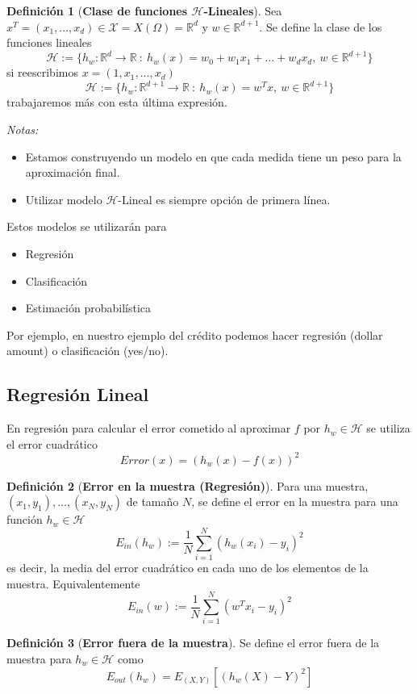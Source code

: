 \documentclass[11pt,a4paper]{article}
\theoremstyle{definition}
\newtheorem{definition}{Definición}[section]
\newcommand{\R}{\mathbb{R}}
\begin{document}
	\begin{definition}[\textbf{Clase de funciones $\mathcal{H}$-Lineales}]
	
		Sea $x^T=(x_1,...,x_d)\in \mathcal{X}=X(\Omega)=\R^d$ y $w\in \R^{d+1}$. Se define la clase de los funciones lineales
		$$\mathcal{H}:=\{h_w \colon \R^{d} \to \R \ : \ h_w(x)=w_0+w_1x_1+\ldots + w_dx_d,\ w \in \R^{d+1}\}$$
		si reescribimos $x=(1,x_1,...,x_d)$
		$$\mathcal{H}:=\{h_w\colon \R^{d+1} \to \R \ : \ h_w(x)=w^Tx, \ w \in \R^{d+1}\}$$
		trabajaremos más con esta última expresión.
	\end{definition}
	
	\textit{Notas:}
	\begin{itemize}
	\item Estamos construyendo un modelo en que cada medida tiene un peso para la aproximación final.
	\item Utilizar modelo $\mathcal{H}$-Lineal es siempre opción de primera línea.
	\end{itemize}
	
	Estos modelos se utilizarán para 
	\begin{itemize}
		\item Regresión
		\item Clasificación
		\item Estimación probabilística
	\end{itemize}
	Por ejemplo, en nuestro ejemplo del crédito podemos hacer regresión (dollar amount) o clasificación (yes/no).
	
	\subsection{Regresión Lineal}
	En regresión para calcular el error cometido al aproximar $f$ por $h_w\in \mathcal{H}$ se utiliza el error cuadrático
	$$Error(x)=(h_w(x)-f(x))^2$$
	
	\begin{definition}[\textbf{Error en la muestra (Regresión)}]
	Para una muestra, $(x_1,y_1),\ldots,(x_N,y_N)$ de tamaño $N$, se define el error en la muestra para una función $h_w\in \mathcal{H}$ 
		$$E_{in} (h_w):=\frac{1}{N}\sum_{i=1}^N(h_w(x_i)-y_i)^2$$
	es decir, la media del error cuadrático en cada uno de los elementos de la muestra. Equivalentemente
	$$E_{in} (w):=\frac{1}{N}\sum_{i=1}^N(w^Tx_i-y_i)^2$$
	\end{definition}
	
	\begin{definition}[\textbf{Error fuera de la muestra}]
	Se define el error fuera de la muestra para $h_w \in \mathcal{H}$ como
	$$E_{out}(h_w)=E_{(X,Y)} \left[(h_w(X)-Y)^2\right]$$
	\end{definition}
	
\end{document}
